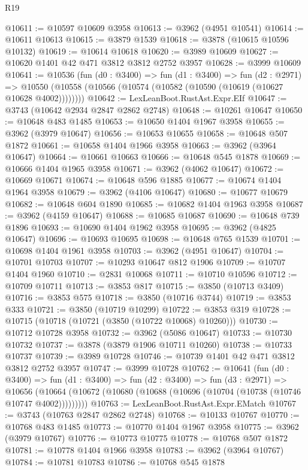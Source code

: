 \begin{lexlean}{R19}
\begin{coremodule}
@10611 := @10597 @10609 @3958
@10613 := @3962 (@4951 @10541)
@10614 := @10611 @10613
@10615 := @3879 @1539
@10618 := @3878 (@10615 @10596 @10132)
@10619 := @10614 @10618
@10620 := @3989 @10609
@10627 := @10620 @1401 @42 @471 @3812 @3812 @2752 @3957
@10628 := @3999 @10609
@10641 := @10536
    (fun (d0 : @3400) =>
    fun (d1 : @3400) =>
    fun (d2 : @2971) =>
    @10550 (@10558 (@10566 (@10574 (@10582 (@10590 (@10619 (@10627 @10628 @4002))))))))
@10642 := LexLeanBoot.RustAst.Expr.EIf
@10647 := @3743 (@10642 @2934 @2847 @2862 @2748)
@10648 := @10261 @10647
@10650 := @10648 @483 @1485
@10653 := @10650 @1404 @1967 @3958
@10655 := @3962 (@3979 @10647)
@10656 := @10653 @10655
@10658 := @10648 @507 @1872
@10661 := @10658 @1404 @1966 @3958
@10663 := @3962 (@3964 @10647)
@10664 := @10661 @10663
@10666 := @10648 @545 @1878
@10669 := @10666 @1404 @1965 @3958
@10671 := @3962 (@4062 @10647)
@10672 := @10669 @10671
@10674 := @10648 @596 @1885
@10677 := @10674 @1404 @1964 @3958
@10679 := @3962 (@4106 @10647)
@10680 := @10677 @10679
@10682 := @10648 @604 @1890
@10685 := @10682 @1404 @1963 @3958
@10687 := @3962 (@4159 @10647)
@10688 := @10685 @10687
@10690 := @10648 @739 @1896
@10693 := @10690 @1404 @1962 @3958
@10695 := @3962 (@4825 @10647)
@10696 := @10693 @10695
@10698 := @10648 @765 @1539
@10701 := @10698 @1404 @1961 @3958
@10703 := @3962 (@4951 @10647)
@10704 := @10701 @10703
@10707 := @10293 @10647 @812 @1906
@10709 := @10707 @1404 @1960
@10710 := @2831 @10068
@10711 := @10710 @10596
@10712 := @10709 @10711
@10713 := @3853 @817
@10715 := @3850 (@10713 @3409)
@10716 := @3853 @575
@10718 := @3850 (@10716 @3744)
@10719 := @3853 @333
@10721 := @3850 (@10719 @10299)
@10722 := @3853 @319
@10728 := @10715 (@10718 (@10721 (@3850 (@10722 @10068) @10260)))
@10730 := @10712 @10728 @3958
@10732 := @3962 (@5086 @10647)
@10733 := @10730 @10732
@10737 := @3878 (@3879 @1906 @10711 @10260)
@10738 := @10733 @10737
@10739 := @3989 @10728
@10746 := @10739 @1401 @42 @471 @3812 @3812 @2752 @3957
@10747 := @3999 @10728
@10762 := @10641
    (fun (d0 : @3400) =>
    fun (d1 : @3400) =>
    fun (d2 : @3400) =>
    fun (d3 : @2971) =>
    @10656 (@10664 (@10672 (@10680 (@10688 (@10696 (@10704 (@10738 (@10746 @10747 @4002)))))))))
@10763 := LexLeanBoot.RustAst.Expr.EMatch
@10767 := @3743 (@10763 @2847 @2862 @2748)
@10768 := @10133 @10767
@10770 := @10768 @483 @1485
@10773 := @10770 @1404 @1967 @3958
@10775 := @3962 (@3979 @10767)
@10776 := @10773 @10775
@10778 := @10768 @507 @1872
@10781 := @10778 @1404 @1966 @3958
@10783 := @3962 (@3964 @10767)
@10784 := @10781 @10783
@10786 := @10768 @545 @1878

\end{coremodule}
\end{lexlean}
